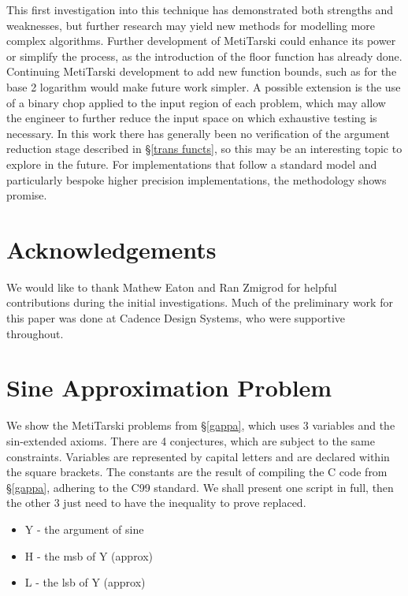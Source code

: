 \documentclass{fac}
\begin{document}
This first investigation into this technique has demonstrated both strengths and weaknesses, but further research may yield new methods for modelling more complex algorithms. Further development of MetiTarski could enhance its power or simplify the process, as the introduction of the floor function has already done. Continuing MetiTarski development to add new function bounds, such as for the base 2 logarithm would make future work simpler. A possible extension is the use of a binary chop applied to the input region of each problem, which may allow the engineer to further reduce the input space on which exhaustive testing is necessary. In this work there has generally been no verification of the argument reduction stage described in \S \ref{trans functs}, so this may be an interesting topic to explore in the future. For implementations that follow a standard model and particularly bespoke higher precision implementations, the methodology shows promise.


\section*{Acknowledgements}
We would like to thank Mathew Eaton and Ran Zmigrod for helpful contributions during the initial investigations. Much of the preliminary work for this paper was done at Cadence Design Systems, who were supportive throughout. 


   
  

\appendix
\section{Sine Approximation Problem} \label{sine_appendix}
We show the MetiTarski problems from \S \ref{gappa}, which uses 3 variables and the sin-extended axioms. There are 4 conjectures, which are subject to the same constraints. Variables are represented by capital letters and are declared within the square brackets. The constants are the result of compiling the C code from \S \ref{gappa}, adhering to the C99 standard. We shall present one script in full, then the other 3 just need to have the inequality to prove replaced. 
\begin{itemize}
    \item Y - the argument of sine
    \item H - the msb of Y (approx)
    \item L - the lsb of Y (approx)
\end{itemize}
\end{document}
